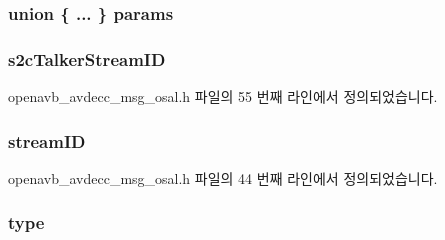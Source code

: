 \subsubsection[{\texorpdfstring{params}{params}}]{\setlength{\rightskip}{0pt plus 5cm}union \{ ... \}   params}\hypertarget{structopenavb_avdecc_message__t_ac4afd7e03fbcb40085aff2fc50dc6df6}{}\label{structopenavb_avdecc_message__t_ac4afd7e03fbcb40085aff2fc50dc6df6}
\subsubsection[{\texorpdfstring{s2c\+Talker\+Stream\+ID}{s2cTalkerStreamID}}]{ s2c\+Talker\+Stream\+ID}\hypertarget{structopenavb_avdecc_message__t_a5a95678153298175f4f17004844025ca}{}\label{structopenavb_avdecc_message__t_a5a95678153298175f4f17004844025ca}


openavb\+\_\+avdecc\+\_\+msg\+\_\+osal.\+h 파일의 55 번째 라인에서 정의되었습니다.

\subsubsection[{\texorpdfstring{stream\+ID}{streamID}}]{ stream\+ID}\hypertarget{structopenavb_avdecc_message__t_a989c1ccd88811e9926203a07d587bc21}{}\label{structopenavb_avdecc_message__t_a989c1ccd88811e9926203a07d587bc21}


openavb\+\_\+avdecc\+\_\+msg\+\_\+osal.\+h 파일의 44 번째 라인에서 정의되었습니다.

\subsubsection[{\texorpdfstring{type}{type}}]{ type}\hypertarget{structopenavb_avdecc_message__t_ae93b36f3af793c202d59cd2edf50835b}{}\label{structopenavb_avdecc_message__t_ae93b36f3af793c202d59cd2edf50835b}


